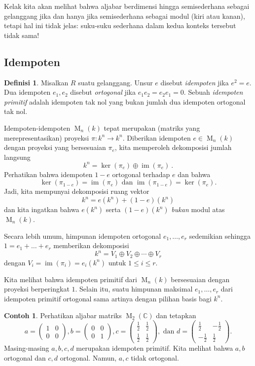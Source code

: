\documentclass[12pt]{article}
\theoremstyle{plain}
\theoremstyle{definition}
\newtheorem{definition}[theorem]{Definisi}
\newtheorem{example}[theorem]{Contoh}
\theoremstyle{remark}
\numberwithin{equation}{section}
\begin{document}
Kelak kita akan melihat bahwa aljabar berdimensi hingga semisederhana sebagai
gelanggang jika dan hanya jika semisederhana sebagai modul (kiri atau kanan),
tetapi hal ini tidak jelas: suku-suku sederhana dalam kedua
konteks tersebut tidak sama!

\subsection{Idempoten}

\begin{definition}
Misalkan $R$ suatu gelanggang. Unsur $e$ disebut \emph{idempoten} jika $e^2=e$.
Dua idempoten $e_1,e_2$ disebut \emph{ortogonal} jika $e_1e_2=e_2e_1=0$.
Sebuah \emph{idempoten primitif} adalah idempoten tak nol
yang bukan jumlah dua idempoten ortogonal tak nol.
\end{definition}

Idempoten-idempoten $\operatorname{M}_n(k)$ tepat merupakan (matriks yang
merepresentasikan) proyeksi $\pi : k^n \to k^n$.
Diberikan idempoten $e \in \operatorname{M}_n(k)$ dengan proyeksi
yang bersesuaian $\pi_e$, kita memperoleh dekomposisi jumlah langsung
\[
k^n = \ker(\pi_e) \oplus \operatorname{im}(\pi_e)
\ .
\]
Perhatikan bahwa idempoten $1-e$ ortogonal terhadap $e$ dan bahwa
\[
\ker(\pi_{1-e}) = \operatorname{im}(\pi_{e})
\textrm{ dan }
\operatorname{im}(\pi_{1-e}) = \ker(\pi_e).
\]
Jadi, kita mempunyai dekomposisi ruang vektor
\[
k^n = e(k^n) + (1-e)(k^n)
\]
dan kita ingatkan bahwa $e(k^n)$ serta $(1-e)(k^n)$ \emph{bukan}
modul atas $\operatorname{M}_n(k)$.

Secara lebih umum, himpunan idempoten ortogonal $e_1,\ldots,e_r$
sedemikian sehingga $1=e_1+\ldots+e_r$ memberikan dekomposisi
\[
k^n = V_1 \oplus V_2 \oplus \cdots \oplus V_r
\]
dengan $V_i = \operatorname{im}(\pi_i) = e_i(k^n)$ untuk $1 \le i \le r$.

Kita melihat bahwa idempoten primitif dari $\operatorname{M}_n(k)$
bersesuaian dengan proyeksi berperingkat $1$.
Selain itu, suatu himpunan maksimal $e_1,\ldots,e_r$ dari idempoten
primitif ortogonal sama artinya dengan pilihan basis bagi $k^n$.

\begin{example}
Perhatikan aljabar matriks $\operatorname{M}_2(\mathbb{C})$
dan tetapkan
\[
a = \begin{pmatrix} 1 & 0 \\ 0 & 0 \end{pmatrix},
b = \begin{pmatrix} 0 & 0 \\ 0 & 1 \end{pmatrix},
c = \begin{pmatrix} \frac{1}{2} & \frac{1}{2} \\ \frac{1}{2} & \frac{1}{2} \end{pmatrix},
\textrm{ dan }
d = \begin{pmatrix} \frac{1}{2} & -\frac{1}{2} \\ -\frac{1}{2} & \frac{1}{2} \end{pmatrix}.
\]
Masing-masing $a,b,c,d$ merupakan idempoten primitif.
Kita melihat bahwa $a,b$ ortogonal dan $c,d$ ortogonal.
Namun, $a,c$ tidak ortogonal.
\end{example}
\end{document}
